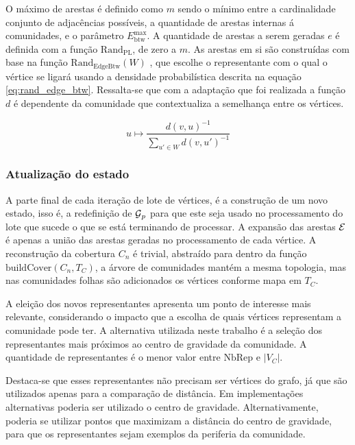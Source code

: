 \documentclass[notes.tex]{subfiles}
\begin{document}
O máximo de arestas é definido como $m$ sendo o mínimo entre a cardinalidade conjunto de adjacências possíveis, a quantidade de arestas internas á comunidades, e o parâmetro $E_\text{btw}^\text{max}$.
A quantidade de arestas a serem geradas $e$ é  definida com a função $\text{Rand}_\text{PL}$, de zero a $m$.
As arestas em si são construídas com base na função $\text{Rand}_\text{EdgeBtw}(W)$ \cite{largeron2015generating}, que escolhe o representante com o qual o vértice se ligará usando a densidade probabilística descrita na equação \ref{eq:rand_edge_btw}.
Ressalta-se que com a adaptação que foi realizada a função $d$ é dependente da comunidade que contextualiza a semelhança entre os vértices.

\begin{equation}\label{eq:rand_edge_btw}
    u \mapsto \frac{d(v, u)^{-1}}{\displaystyle\sum_{u' \in W}d(v, u')^{-1}}
\end{equation}

\subsubsection{Atualização do estado}

A parte final de cada iteração de lote de vértices, é a construção de um novo estado, isso é, a redefinição de $\operatorname{\mathcal{G}}_p$ para que este seja usado no processamento do lote que sucede o que se está terminando de processar.
A expansão das arestas  $\operatorname{\mathcal{E}}$ é apenas a união das arestas geradas no processamento de cada vértice.
A reconstrução da cobertura  $C_n$ é trivial, abstraído para dentro da função $\text{buildCover}(C_n, T_C)$, a árvore de comunidades mantém a mesma topologia, mas nas comunidades folhas são adicionados os vértices conforme mapa em $T_C$. 

A eleição dos novos representantes apresenta um ponto de interesse mais relevante, considerando o impacto que a escolha de quais vértices representam a comunidade pode ter.
A alternativa utilizada neste trabalho é a seleção dos representantes mais próximos ao centro de gravidade da comunidade.
A quantidade de representantes é o menor valor entre $\text{NbRep}$ e $|V_C|$.

Destaca-se que esses representantes não precisam ser vértices do grafo, já que são utilizados apenas para a comparação de distância.
Em implementações alternativas poderia ser utilizado o centro de gravidade.
Alternativamente, poderia se utilizar pontos que maximizam a distância do centro de gravidade, para que os representantes sejam exemplos da periferia da comunidade.
\end{document}
